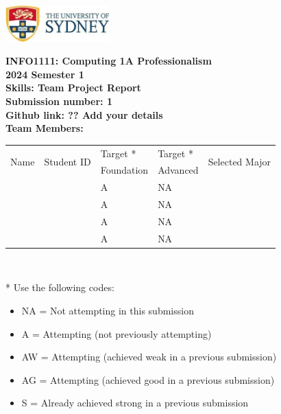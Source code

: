 \documentclass[a4paper, 11pt]{report}
\begin{document}
\begin{titlepage}
\begin{flushright}
\includegraphics[width=4cm]{USyd}\\[1cm]
\end{flushright}

\begin{centering}
\textbf{\huge INFO1111: Computing 1A Professionalism}\\[0.75cm]
\textbf{\huge 2024 Semester 1}\\[2cm]
\textbf{\huge Skills: Team Project Report}\\[2cm]

\textbf{\large Submission number: 1 }\\[0.5cm]
\textbf{\large Github link: ?? Add your details}\\[0.75cm]
\textbf{\huge Team Members:}\\[0.75cm]

\begin{tabular}{|p{}|p{}|p{}|p{}|p{}|}
	\hline
	\multirow{2}{*}{Name} & \multirow{2}{*}{Student ID} & Target * & Target * & \multirow{2}{*}{Selected Major} \\
	 & & Foundation & Advanced & \\
	\hline
	\hline
	\raggedright{\studA} & \sidA & A & NA & \majA \\
	\hline
	\raggedright{\studB} & \sidB & A & NA & \majB \\
	\hline
	\raggedright{\studC} & \sidC & A & NA & \majC \\
	\hline
	\raggedright{\studD} & \sidD & A & NA & \majD \\
	\hline
\end{tabular}
\\[0.5cm]
\end{centering}

* Use the following codes:
\begin{itemize}
\setlength\itemsep{0em}
\item NA = Not attempting in this submission
\item A = Attempting (not previously attempting)
\item AW = Attempting (achieved weak in a previous submission) 
\item AG = Attempting (achieved good in a previous submission)
\item S = Already achieved strong in a previous submission
\end{itemize}

\thispagestyle{empty}
\end{titlepage}
\end{document}
